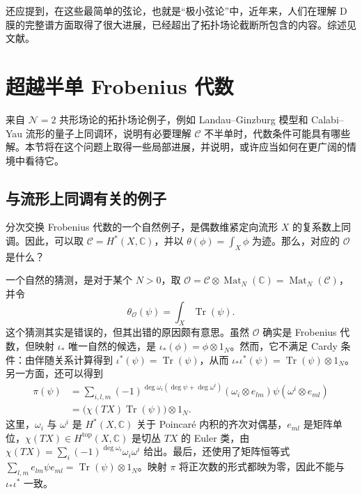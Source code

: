 还应提到，在这些最简单的弦论，也就是“极小弦论”中，近年来，人们在理解 D 膜的完整谱方面取得了很大进展，已经超出了拓扑场论截断所包含的内容。综述见文献。

\section{超越半单 Frobenius 代数}\label{sec:2.5}

来自 $\mathcal{N}=2$ 共形场论的拓扑场论例子，例如 Landau--Ginzburg 模型和 Calabi--Yau 流形的量子上同调环，说明有必要理解 $\mathcal{C}$ 不半单时，代数条件可能具有哪些解。本节将在这个问题上取得一些局部进展，并说明，或许应当如何在更广阔的情境中看待它。

\subsection{与流形上同调有关的例子}\label{sec:2.5.1}

分次交换 Frobenius 代数的一个自然例子，是偶数维紧定向流形 $X$ 的复系数上同调。因此，可以取 $\mathcal{C}=H^*(X,\mathbb{C})$，并以 $\theta(\phi)=\int_X\phi$ 为迹。那么，对应的 $\mathcal{O}$ 是什么？

一个自然的猜测，是对于某个 $N>0$，取 $\mathcal{O}=\mathcal{C}\otimes\operatorname{Mat}_N(\mathbb{C})=\operatorname{Mat}_N(\mathcal{C})$，并令
\begin{equation}\label{eq:2.67}
\theta_{\mathcal{O}}(\psi)=\int_X\operatorname{Tr}(\psi).
\end{equation}
这个猜测其实是错误的，但其出错的原因颇有意思。虽然 $\mathcal{O}$ 确实是 Frobenius 代数，但映射 $\iota_*$ 唯一自然的候选，是 $\iota_*(\phi)=\phi\otimes1_N$。然而，它不满足 Cardy 条件：由伴随关系计算得到 $\iota^*(\psi)=\operatorname{Tr}(\psi)$，从而 $\iota_*\iota^*(\psi)=\operatorname{Tr}(\psi)\otimes1_N$。另一方面，还可以得到
\begin{equation}\label{eq:2.68}
\begin{aligned}
\pi(\psi)
&=\sum_{i,l,m}(-1)^{\deg\omega_i(\deg\psi+\deg\omega^i)}
(\omega_i\otimes e_{lm})\psi(\omega^i\otimes e_{ml})\\
&=\bigl(\chi(TX)\operatorname{Tr}(\psi)\bigr)\otimes1_N.
\end{aligned}
\end{equation}
这里，$\omega_i$ 与 $\omega^i$ 是 $H^*(X,\mathbb{C})$ 关于 Poincaré 内积的齐次对偶基，$e_{ml}$ 是矩阵单位，$\chi(TX)\in H^{\mathrm{top}}(X,\mathbb{C})$ 是切丛 $TX$ 的 Euler 类，由 $\chi(TX)=\sum_i(-1)^{\deg\omega_i}\omega_i\omega^i$ 给出。最后，还使用了矩阵恒等式 $\sum_{l,m}e_{lm}\psi e_{ml}=\operatorname{Tr}(\psi)\otimes1_N$。映射 $\pi$ 将正次数的形式都映为零，因此不能与 $\iota_*\iota^*$ 一致。

